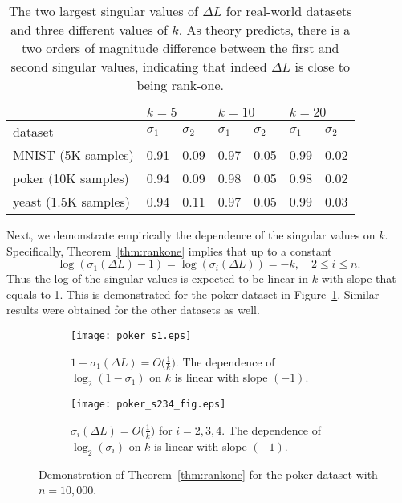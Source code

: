 \documentclass[11pt]{article}
\begin{document}
\begin{table}
\begin{center}
\begin{tabular}{|l|l|l|l|l|l|l|}
\hline
                     & \multicolumn{2}{l|}{$k=5$} & \multicolumn{2}{l|}{$k=10$} & \multicolumn{2}{l|}{$k=20$} \\ \hline
dataset              & $\sigma_1$    & $\sigma_2$   & $\sigma_1$    & $\sigma_2$   & $\sigma_1$    & $\sigma_2$   \\ \hline
MNIST (5K samples)   & 0.91         & 0.09        & 0.97         & 0.05 & 0.99         & 0.02        \\ \hline
poker (10K samples)  & 0.94         & 0.09        & 0.98         & 0.05 & 0.98         & 0.02        \\ \hline
yeast (1.5K samples) & 0.94         & 0.11       & 0.97         & 0.05        & 0.99         & 0.03        \\ \hline
\end{tabular}
\caption{The two largest singular values of $\Delta L$ for real-world datasets and three different values of $k$. As theory predicts, there is a two orders of magnitude difference between the first and second singular values, indicating that indeed $\Delta L$ is close to being rank-one.}
\label{tbl:sigma1}
\end{center}
\end{table}

Next, we demonstrate empirically the dependence of the singular values on $k$. Specifically, Theorem~\ref{thm:rankone} implies that up to a constant
\[ \log(\sigma_1(\Delta L) - 1) =  \log(\sigma_i(\Delta L)) = -k , \quad 2 \le i \le n. \]
Thus the log of the singular values is expected to be linear in $k$ with slope that equals to 1. This is demonstrated for the poker dataset in Figure~\ref{fig:mnist_sings}. Similar results were obtained for the other datasets as well. 

\begin{figure}[t]
    \centering
    \begin{subfigure}[b]{0.4\textwidth}
        \texttt{[image: poker\_s1.eps]}
        \caption{$1 - \sigma_1(\Delta L) = O\big(\frac{1}{k}\big)$. The dependence of $\operatorname{log}_2(1 - \sigma_1)$ on $k$ is linear with slope $(-1)$.}
    \end{subfigure} 
    \qquad \quad
    \begin{subfigure}[b]{0.42\textwidth}
        \texttt{[image: poker\_s234\_fig.eps]}
        \caption{$\sigma_i(\Delta L) = O\big(\frac{1}{k}\big)$  for $i=2,3,4$. The dependence of $\operatorname{log}_2(\sigma_i)$ on $k$ is linear with slope $(-1)$.}
    \end{subfigure}   
    \caption{Demonstration of Theorem~\ref{thm:rankone} for the poker dataset with $n=10,000$.}\label{fig:mnist_sings}
\end{figure}
\end{document}
